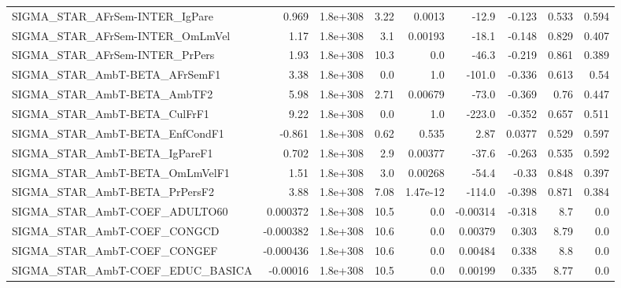 \begin{tabular}{lrrrrrrrr}
SIGMA\_STAR\_AFrSem-INTER\_IgPare        &       0.969 &     1.8e+308 &    3.22 &   0.0013 &      -12.9 &      -0.123 &        0.533 &         0.594 \\
SIGMA\_STAR\_AFrSem-INTER\_OmLmVel       &        1.17 &     1.8e+308 &     3.1 &  0.00193 &      -18.1 &      -0.148 &        0.829 &         0.407 \\
SIGMA\_STAR\_AFrSem-INTER\_PrPers        &        1.93 &     1.8e+308 &    10.3 &      0.0 &      -46.3 &      -0.219 &        0.861 &         0.389 \\
SIGMA\_STAR\_AmbT-BETA\_AFrSemF1         &        3.38 &     1.8e+308 &     0.0 &      1.0 &     -101.0 &      -0.336 &        0.613 &          0.54 \\
SIGMA\_STAR\_AmbT-BETA\_AmbTF2           &        5.98 &     1.8e+308 &    2.71 &  0.00679 &      -73.0 &      -0.369 &         0.76 &         0.447 \\
SIGMA\_STAR\_AmbT-BETA\_CulFrF1          &        9.22 &     1.8e+308 &     0.0 &      1.0 &     -223.0 &      -0.352 &        0.657 &         0.511 \\
SIGMA\_STAR\_AmbT-BETA\_EnfCondF1        &      -0.861 &     1.8e+308 &    0.62 &    0.535 &       2.87 &      0.0377 &        0.529 &         0.597 \\
SIGMA\_STAR\_AmbT-BETA\_IgPareF1         &       0.702 &     1.8e+308 &     2.9 &  0.00377 &      -37.6 &      -0.263 &        0.535 &         0.592 \\
SIGMA\_STAR\_AmbT-BETA\_OmLmVelF1        &        1.51 &     1.8e+308 &     3.0 &  0.00268 &      -54.4 &       -0.33 &        0.848 &         0.397 \\
SIGMA\_STAR\_AmbT-BETA\_PrPersF2         &        3.88 &     1.8e+308 &    7.08 & 1.47e-12 &     -114.0 &      -0.398 &        0.871 &         0.384 \\
SIGMA\_STAR\_AmbT-COEF\_ADULTO60         &    0.000372 &     1.8e+308 &    10.5 &      0.0 &   -0.00314 &      -0.318 &          8.7 &           0.0 \\
SIGMA\_STAR\_AmbT-COEF\_CONGCD           &   -0.000382 &     1.8e+308 &    10.6 &      0.0 &    0.00379 &       0.303 &         8.79 &           0.0 \\
SIGMA\_STAR\_AmbT-COEF\_CONGEF           &   -0.000436 &     1.8e+308 &    10.6 &      0.0 &    0.00484 &       0.338 &          8.8 &           0.0 \\
SIGMA\_STAR\_AmbT-COEF\_EDUC\_BASICA      &    -0.00016 &     1.8e+308 &    10.5 &      0.0 &    0.00199 &       0.335 &         8.77 &           0.0 \\

\end{tabular}
